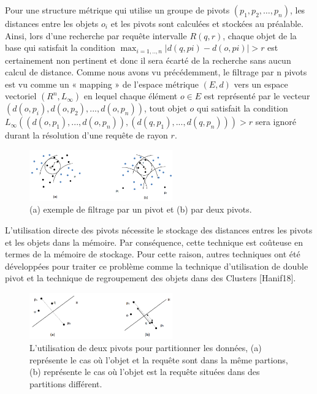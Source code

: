 Pour une structure métrique qui utilise un groupe de pivots $ (p_1,p_2,…, p_n) $, les distances entre les objets $ o_i $ et les pivots sont calculées et stockées au préalable. Ainsi, lors d’une recherche par requête intervalle $ R(q,r) $, chaque objet de la base qui satisfait la condition $ \max_{i=1,..,n}{|d(q,pi)-d(o,pi)|} > r $ est certainement non pertinent et donc il sera écarté de la recherche sans aucun calcul de distance. Comme nous avons vu précédemment, le filtrage par n pivots est vu comme un « mapping » de l’espace métrique $ (E,d) $ vers un espace vectoriel $ (R^n, L_\infty) $ en lequel chaque élément $ o \in E $ est représenté par le vecteur $ (d(o,p_i), d(o,p_2),..., d(o,p_n)) $, tout objet $ o $ qui satisfait la condition $ L_\infty((d(o,p_1),..., d(o,p_n)),(d(q,p_1),..., d(q,p_n))) > r  $ sera ignoré durant la résolution d’une requête de rayon $ r $.

\begin{figure}[H]
	\centering
	\includegraphics[width=0.55\textwidth]{Figures/npivot.png} %
	\caption{(a) exemple de filtrage par un pivot et (b) par deux pivots.}
\end{figure}

L’utilisation directe des pivots nécessite le stockage des distances entres les pivots et les objets dans la mémoire. Par conséquence, cette technique est coûteuse en termes de la mémoire de stockage. Pour cette raison, autres techniques ont été développées pour traiter ce problème comme la technique d’utilisation de double pivot et la technique de regroupement des objets dans des Clusters [Hanif18].


\begin{figure}[H]
	\centering
	\includegraphics[width=0.55\textwidth]{Figures/2pivot.png} %
	\caption{L'utilisation de deux pivots pour partitionner les données, (a) représente le cas où l'objet et la requête sont dans la même partions, (b) représente le cas où l’objet est la requête situées dans des partitions différent.}
\end{figure}

